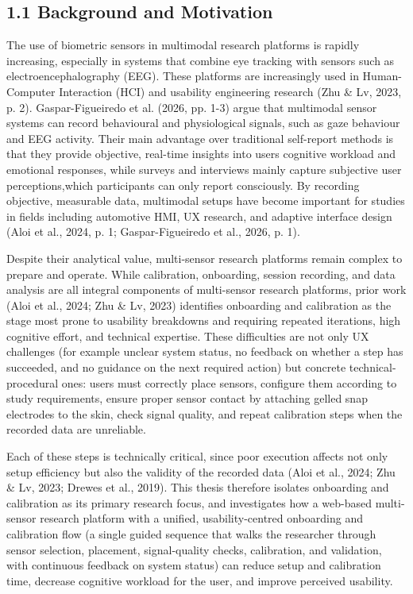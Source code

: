 \documentclass[
]{article}
\begin{document}
\hypertarget{background-and-motivation}{%
\subsection{1.1 Background and Motivation}\label{background-and-motivation}}

The use of biometric sensors in multimodal research platforms is rapidly increasing, especially in systems that combine eye tracking with sensors such as electroencephalography (EEG). These platforms are increasingly used in Human-Computer Interaction (HCI) and usability engineering research (Zhu \& Lv, 2023, p. 2). Gaspar-Figueiredo et al. (2026, pp. 1-3) argue that multimodal sensor systems can record behavioural and physiological signals, such as gaze behaviour and EEG activity. Their main advantage over traditional self-report methods is that they provide objective, real-time insights into users\textquotesingle{} cognitive workload and emotional responses, while surveys and interviews mainly capture subjective user perceptions,which participants can only report consciously. By recording objective, measurable data, multimodal setups have become important for studies in fields including automotive HMI, UX research, and adaptive interface design (Aloi et al., 2024, p. 1; Gaspar-Figueiredo et al., 2026, p. 1).

Despite their analytical value, multi-sensor research platforms remain complex to prepare and operate. While calibration, onboarding, session recording, and data analysis are all integral components of multi-sensor research platforms, prior work (Aloi et al., 2024; Zhu \& Lv, 2023) identifies onboarding and calibration as the stage most prone to usability breakdowns and requiring repeated iterations, high cognitive effort, and technical expertise. These difficulties are not only UX challenges (for example unclear system status, no feedback on whether a step has succeeded, and no guidance on the next required action) but concrete technical-procedural ones: users must correctly place sensors, configure them according to study requirements, ensure proper sensor contact by attaching gelled snap electrodes to the skin, check signal quality, and repeat calibration steps when the recorded data are unreliable.

Each of these steps is technically critical, since poor execution affects not only setup efficiency but also the validity of the recorded data (Aloi et al., 2024; Zhu \& Lv, 2023; Drewes et al., 2019). This thesis therefore isolates onboarding and calibration as its primary research focus, and investigates how a web-based multi-sensor research platform with a unified, usability-centred onboarding and calibration flow (a single guided sequence that walks the researcher through sensor selection, placement, signal-quality checks, calibration, and validation, with continuous feedback on system status) can reduce setup and calibration time, decrease cognitive workload for the user, and improve perceived usability.
\end{document}
